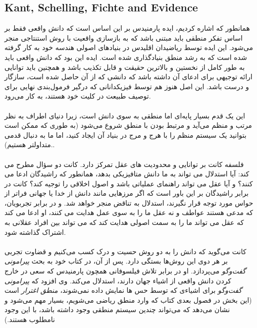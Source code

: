\documentclass[10pt,a4paper]{article}
\begin{document}
                    \subsection{Kant, Schelling, Fichte and Evidence} همانطور که اشاره کردیم، ایده پارمنیدس بر این اساس است که دانش واقعی فقط بر اساس تفکر منطقی باید مبتنی باشد که به بازسازی واقعیت با روش استنتاجی منجر می‌شود. این ایده توسط ریاضیدان اقلیدس در بنیادهای اصولی هندسه خود به کار گرفته شده است که به رشد منطق بنیادگذاری شده است. ایده این بود که دانش واقعی باید به طور کامل از نخستین و بالاترین حقیقت و قابل تکذیب باشد و همچنین باید توانایی ارائه توجیهی برای ادعای آن داشته باشد که دانشی که از آن حاصل شده است، سازگار و درست باشد. این اصل هنوز هم توسط فیزیکدانانی که درگیر فرمول‌بندی نهایی برای توصیف طبیعت در کلیت خود هستند، به کار می‌رود.
                    \\
                    \\
                    این یک قدم بسیار پایه‌ای اما منطقی به سوی دانش است، زیرا دنیای اطراف به نظر مرتب و منظم می‌آید و مرتبط بودن با منطق شروع می‌شود (به طوری که ممکن است بتوانید یک سیستم منظم را با هرج و مرج در بنیاد آن ایجاد کنید، اما ما به دنبال قدمی متداولتر هستیم)..\cite{Kuppers2018-vv}
                    \\
                    \\
فلسفه کانت بر توانایی و محدودیت های عقل تمرکز دارد. کانت دو سؤال مطرح می کند: آیا استدلال می تواند به ما دانش متافیزیکی بدهد، همانطور که راشیدگان ادعا می کنند؟ و آیا عقل می تواند راهنمای عملیاتی باشد و اصول اخلاقی را توجیه کند؟ کانت در برابر راشیدگان بر این باور است که اگر مرزهایی مانند دانش از خدا یا جهانی فراتر از حواس مورد توجه قرار نگیرند، استدلال به تناقض منجر خواهد شد. و در برابر تجربویان، که مدعی هستند عواطف و نه عقل ما را به سوی عمل هدایت می کنند، او ادعا می کند که عقل می تواند ما را به سمت اصولی هدایت کند که می تواند بین افراد عقلانی به اشتراک گذاشته شود.
                    \\
                    \\
                    کانت می‌گوید که دانش را به دو روش حسیت و درک کسب می‌کنیم و قضاوت تجربی بر هر دوی این روش‌ها بستگی دارد. پس از آن، در کتاب خود به بحث \textit{پیرامونی گفت‌وگو} می‌پردازد. او در برابر تلاش فیلسوفانی همچون پارمنیدس که سعی در خارج کردن دانش واقعی از اشیاء جهان دارند، استدلال می‌کند. وی افزود که \textit{پیرامونی گفت‌وگو} برای اشیاءی که توسط حس ها نمایش داده نمی‌شوند، \textit{منطق اغترار} است (این بخش در فصول بعدی کتاب که وارد منطق ریاضی می‌شویم، بسیار مهم می‌شود و نشان می‌دهد که می‌تواند چندین سیستم منطقی وجود داشته باشد، با این وجود نامطلوب هستند.)\cite{sep-kant-reason}
\end{document}

